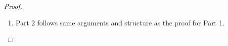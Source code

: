 \begin{proof}
\begin{enumerate}[$-$]
\begin{enumerate}[a)]
\begin{enumerate}[i)]
%
%
							The result is then immediate from the definition of $\Re$ that
							requires
							\[
								\horel{\Gamma}{\Delta_1'}{\news{\widetilde{m_1}}{P  } }
								{\hwb}
								{\Delta_2'}{\news{\widetilde{m_2}}{Q'  } }
							\]
					\item	A synchronization along name $t$: this is not possible
							due to the freshness of $t$.
				\end{enumerate}
	\end{enumerate}
    This concludes the proof of Part 1.
    	
	\item Part 2 follows same arguments and structure as	the proof for Part 1.


\end{enumerate}
\end{proof}
